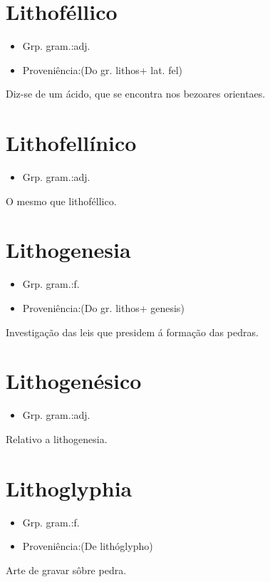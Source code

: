 \section{Lithoféllico}
\begin{itemize}
\item {Grp. gram.:adj.}
\end{itemize}
\begin{itemize}
\item {Proveniência:(Do gr. \textunderscore lithos\textunderscore  + lat. \textunderscore fel\textunderscore )}
\end{itemize}
Diz-se de um ácido, que se encontra nos bezoares orientaes.
\section{Lithofellínico}
\begin{itemize}
\item {Grp. gram.:adj.}
\end{itemize}
O mesmo que \textunderscore lithoféllico\textunderscore .
\section{Lithogenesia}
\begin{itemize}
\item {Grp. gram.:f.}
\end{itemize}
\begin{itemize}
\item {Proveniência:(Do gr. \textunderscore lithos\textunderscore  + \textunderscore genesis\textunderscore )}
\end{itemize}
Investigação das leis que presidem á formação das pedras.
\section{Lithogenésico}
\begin{itemize}
\item {Grp. gram.:adj.}
\end{itemize}
Relativo a lithogenesia.
\section{Lithoglyphia}
\begin{itemize}
\item {Grp. gram.:f.}
\end{itemize}
\begin{itemize}
\item {Proveniência:(De \textunderscore lithóglypho\textunderscore )}
\end{itemize}
Arte de gravar sôbre pedra.
